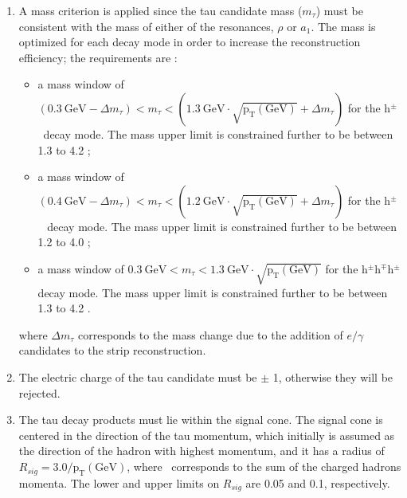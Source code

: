 \begin{enumerate}
 \item A mass criterion is applied since the tau candidate mass ($m_{\tau}$) must be consistent with the 
 mass of either of the resonances, $\rho$ or $a_{1}$. The mass is optimized for each decay mode
in order to increase the reconstruction efficiency; the requirements are \cite{CMS-PAS-TAU-16-002}:
\begin{itemize}
\item a mass window of 
$(0.3~\textrm{GeV}-\Delta m_{\tau}) < m_{\tau} < (1.3~\textrm{GeV}\cdot\sqrt{\textrm{p}_{\textrm{T}} (\textrm{GeV})} + \Delta m_{\tau})$
 for the h$^{\pm}$\picero~decay mode. The mass upper limit is constrained further to be between 1.3 to 4.2 \GeV;
 \item a mass window of 
 $(0.4~\textrm{GeV}-\Delta m_{\tau}) < m_{\tau} < (1.2~\textrm{GeV}\cdot\sqrt{\textrm{p}_{\textrm{T}} (\textrm{GeV})} + \Delta m_{\tau})$
 for the h$^{\pm}$\picero\picero~ decay mode. The mass upper limit is constrained further to be between 1.2 to 4.0 \GeV;
 \item a mass window of
 $0.3~\textrm{GeV} < m_{\tau} < 1.3~\textrm{GeV}\cdot\sqrt{\textrm{p}_{\textrm{T}} (\textrm{GeV})}$ 
 for the h$^{\pm}$h$^{\mp}$h$^{\pm}$ decay mode. The mass upper limit is constrained further to be between 1.3 to 4.2 \GeV. \\

 
 
 \end{itemize}
\noindent where $\Delta m_{\tau}$ corresponds to the mass change due to the addition of $e/\gamma$ candidates 
to the strip reconstruction. 
 \item The electric charge of the tau candidate must be $\pm$ 1, otherwise they will be rejected.
 \item The tau decay products must lie within the signal cone. The signal cone is centered in the 
 direction of the tau momentum, which initially is assumed as the direction of the hadron with highest momentum, and it 
 has a radius of $R_{sig}=3.0 / \textrm{p}_{\textrm{T}} (\textrm{GeV})$, where 
 \pt~corresponds to the sum of the charged hadrons momenta. The lower and upper limits on $R_{sig}$ are
 0.05 and 0.1, respectively.
\end{enumerate}

